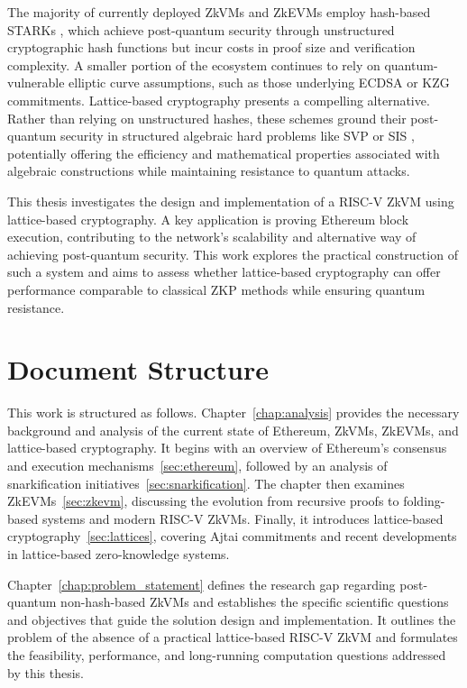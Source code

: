 The majority of currently deployed ZkVMs and ZkEVMs employ hash-based STARKs \cite{SoKZkVMs, STARK},
which achieve post-quantum security through unstructured cryptographic hash functions
but incur costs in proof size and verification complexity. A smaller portion
of the ecosystem continues to rely on quantum-vulnerable elliptic curve assumptions,
such as those underlying ECDSA or KZG commitments. Lattice-based cryptography
presents a compelling alternative. Rather than relying on unstructured hashes,
these schemes ground their post-quantum security in structured algebraic hard
problems like SVP or SIS \cite{Ajtai1998, LatticeTutorial, LatticesInZKP},
potentially offering the efficiency and mathematical properties associated
with algebraic constructions while maintaining resistance to quantum attacks.

This thesis investigates the design and implementation of a RISC-V ZkVM using
lattice-based cryptography. A key application is proving Ethereum block
execution, contributing to the network's scalability and alternative way of
achieving post-quantum security. This work explores the practical construction
of such a system and aims to assess whether lattice-based cryptography can
offer performance comparable to classical ZKP methods while ensuring quantum resistance.

\section*{Document Structure}

This work is structured as follows. Chapter~\ref{chap:analysis} provides the
necessary background and analysis of the current state of Ethereum, ZkVMs,
ZkEVMs, and lattice-based cryptography. It begins with an overview of Ethereum's
consensus and execution mechanisms~\ref{sec:ethereum}, followed by an analysis
of snarkification initiatives~\ref{sec:snarkification}. The chapter then
examines ZkEVMs~\ref{sec:zkevm}, discussing the evolution from recursive proofs
to folding-based systems and modern RISC-V ZkVMs. Finally, it introduces
lattice-based cryptography~\ref{sec:lattices}, covering Ajtai commitments and
recent developments in lattice-based zero-knowledge systems.

Chapter~\ref{chap:problem_statement} defines the research gap regarding
post-quantum non-hash-based ZkVMs and establishes the specific scientific questions and
objectives that guide the solution design and implementation. It outlines the
problem of the absence of a practical lattice-based RISC-V ZkVM and formulates
the feasibility, performance, and long-running computation questions addressed
by this thesis.

